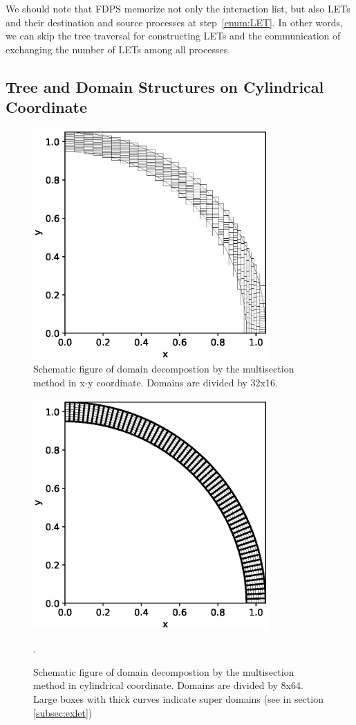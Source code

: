 \documentclass[]{pasj01}
\begin{document}
We should note that FDPS memorize not only the interaction list, but
also LETs and their destination and source processes at
step~\ref{enum:LET}. In other words, we can skip the tree traversal
for constructing LETs and the communication of exchanging the number
of LETs among all processes.

\subsection{Tree and Domain Structures on Cylindrical Coordinate}
\label{subsec:cylcoord}

\begin{figure}
  \centering \includegraphics[width=9cm,clip]{./fig/domain_cart.eps}
  \caption{Schematic figure of domain decompostion by the multisection
    method in x-y coordinate. Domains are divided by 32x16.}
  \label{fig:domain_cart}
\end{figure}

\begin{figure}
  \centering
    \includegraphics[width=9cm,clip]{./fig/domain_cyl.eps}
  \caption{Schematic figure of domain decompostion by the multisection
    method in cylindrical coordinate. Domains are divided by
    8x64. Large boxes with thick curves indicate super domains (see in
    section \ref{subsec:exlet})}.
  \label{fig:domain_cyl}
\end{figure}
\end{document}
